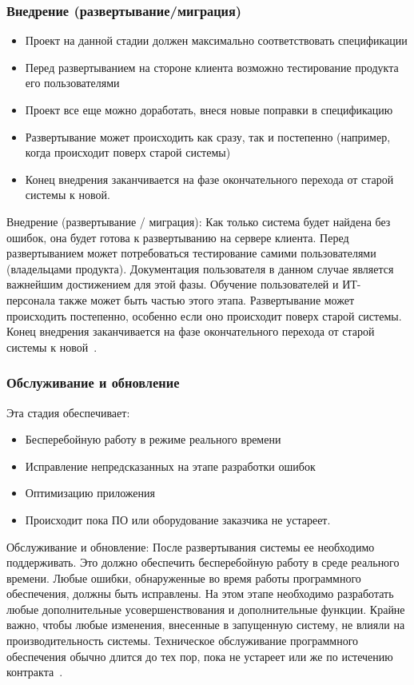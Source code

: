\documentclass{../industrial-development}
\begin{document}
\begin{frame} \frametitle{Внедрение (развертывание/миграция)}
\begin{itemize}
\item Проект на данной стадии должен максимально соответствовать спецификации
\item Перед развертыванием на стороне клиента возможно тестирование продукта его пользователями
\item Проект все еще можно доработать, внеся новые поправки в спецификацию
\item Развертывание может происходить как сразу, так и постепенно (например, когда происходит поверх старой системы)
\item Конец внедрения заканчивается на фазе окончательного перехода от старой системы к новой.
\end{itemize}
\end{frame}
\lecturenotes
Внедрение (развертывание / миграция):
Как только система будет найдена без ошибок, она будет готова к развертыванию на сервере клиента. Перед развертыванием может потребоваться тестирование самими пользователями (владельцами продукта). Документация пользователя в данном случае является важнейшим достижением для этой фазы. Обучение пользователей и ИТ-персонала также может быть частью этого этапа. Развертывание может происходить постепенно, особенно если оно происходит поверх старой системы. Конец внедрения заканчивается на фазе окончательного перехода от старой системы к новой~\cite{SDLC}.

\begin{frame} \frametitle{Обслуживание и обновление}
Эта стадия обеспечивает:
\begin{itemize}
\item Бесперебойную работу в режиме реального времени
\item Исправление непредсказанных на этапе разработки ошибок
\item Оптимизацию приложения
\item Происходит пока ПО или оборудование заказчика не устареет.
\end{itemize}
\end{frame}
\lecturenotes
Обслуживание и обновление:
После развертывания системы ее необходимо поддерживать. Это должно обеспечить бесперебойную работу в среде реального времени. Любые ошибки, обнаруженные во время работы программного обеспечения, должны быть исправлены. На этом этапе необходимо разработать любые дополнительные усовершенствования и дополнительные функции. Крайне важно, чтобы любые изменения, внесенные в запущенную систему, не влияли на производительность системы. Техническое обслуживание программного обеспечения обычно длится до тех пор, пока не устареет или же по истечению контракта~\cite{SDLC}.
\end{document}
